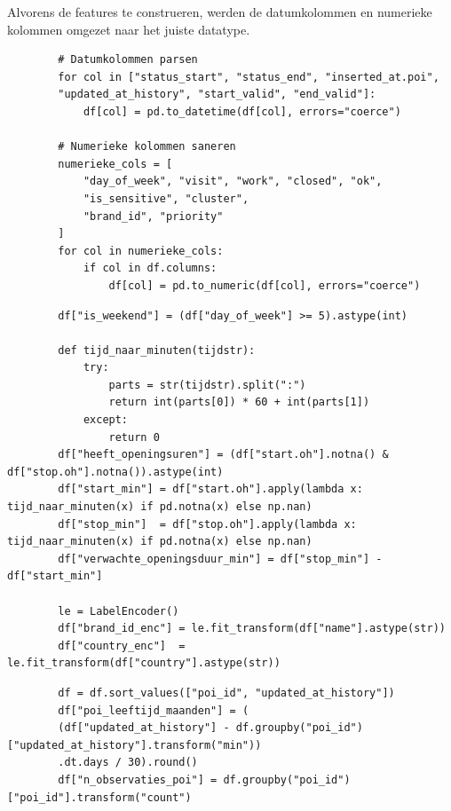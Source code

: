 Alvorens de features te construeren, werden de datumkolommen en numerieke kolommen omgezet naar het juiste datatype.

\begin{listing}[H]
    \begin{verbatim}
        # Datumkolommen parsen
        for col in ["status_start", "status_end", "inserted_at.poi",
        "updated_at_history", "start_valid", "end_valid"]:
            df[col] = pd.to_datetime(df[col], errors="coerce")
        
        # Numerieke kolommen saneren
        numerieke_cols = [
            "day_of_week", "visit", "work", "closed", "ok",
            "is_sensitive", "cluster",
            "brand_id", "priority"
        ]
        for col in numerieke_cols:
            if col in df.columns:
                df[col] = pd.to_numeric(df[col], errors="coerce")
    \end{verbatim}
    \caption[Datatype conversie]{Omzetting van datumkolommen naar het datetime-formaat en numerieke kolommen naar het juiste datatype.}
\end{listing}

\begin{listing}[H]
    \begin{verbatim}
        df["is_weekend"] = (df["day_of_week"] >= 5).astype(int)
        
        def tijd_naar_minuten(tijdstr):
            try:
                parts = str(tijdstr).split(":")
                return int(parts[0]) * 60 + int(parts[1])
            except:
                return 0
        df["heeft_openingsuren"] = (df["start.oh"].notna() & df["stop.oh"].notna()).astype(int)
        df["start_min"] = df["start.oh"].apply(lambda x: tijd_naar_minuten(x) if pd.notna(x) else np.nan)
        df["stop_min"]  = df["stop.oh"].apply(lambda x: tijd_naar_minuten(x) if pd.notna(x) else np.nan)
        df["verwachte_openingsduur_min"] = df["stop_min"] - df["start_min"]
        
        le = LabelEncoder()
        df["brand_id_enc"] = le.fit_transform(df["name"].astype(str))
        df["country_enc"]  = le.fit_transform(df["country"].astype(str))
    \end{verbatim}
    \caption[Feature engineering: overige kenmerken]{Constructie van binaire, openingsuren- en categorische features.}
\end{listing}

\begin{listing}[H]
    \begin{verbatim}
        df = df.sort_values(["poi_id", "updated_at_history"])
        df["poi_leeftijd_maanden"] = (
        (df["updated_at_history"] - df.groupby("poi_id")["updated_at_history"].transform("min"))
        .dt.days / 30).round()
        df["n_observaties_poi"] = df.groupby("poi_id")["poi_id"].transform("count")
    \end{verbatim}
    \caption[Feature engineering: temporele features]{Constructie van de temporele en gedragsmatige features op basis van de historische dataset.}
\end{listing}

